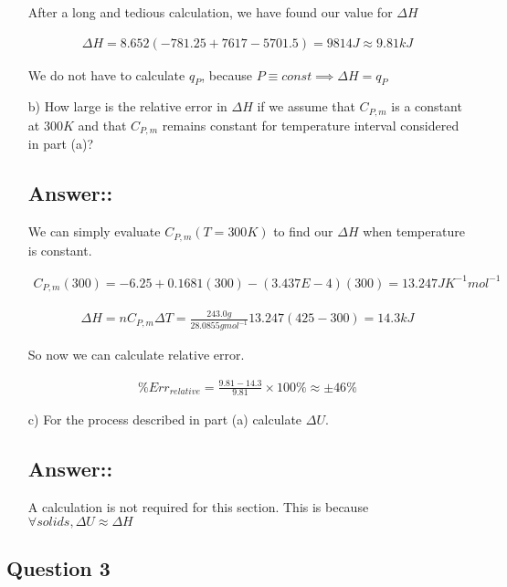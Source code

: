\documentclass[12pt]{book}
\begin{document}
\begin{itemize}
    After a long and tedious calculation, we have found our value for $\Delta H$

    \begin{align*}
        \Delta H=8.652(-781.25+7617-5701.5)=9814J\approx 9.81kJ
    \end{align*}

    We do not have to calculate $q_P$, because $P\equiv const\implies \Delta H=q_P$

    \item[b)] How large is the relative error in $\Delta H$ if we assume that $C_{P,m}$ is a constant at $300K$ and that
    $C_{P,m}$ remains constant for temperature interval considered in part (a)?

    \subsection*{Answer::}

    We can simply evaluate $C_{P,m}(T=300K)$ to find our $\Delta H$ when temperature is constant.

    \begin{align*}
        C_{P,m}(300)=-6.25+0.1681(300)-(3.437E-4)(300)=13.247JK^{-1}mol^{-1}
    \end{align*}

    \begin{align*}
        \Delta H=nC_{P,m}\Delta T=\frac{243.0g}{28.0855gmol^{-1}}13.247(425-300)=14.3kJ
    \end{align*}

    So now we can calculate relative error.

    \begin{align*}
        \%Err_{relative}=\frac{9.81-14.3}{9.81}\times 100\%\approx \pm 46\%
    \end{align*}

    \item[c)] For the process described in part (a) calculate $\Delta U$.
    \subsection*{Answer::}
    A calculation is not required for this section. This is because $\forall solids, \Delta U\approx \Delta H$
\end{itemize}

\subsection*{Question 3}
\end{document}
